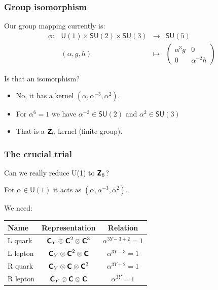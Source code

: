 \documentclass[english, fleqn]{beamer}
\begin{document}
\begin{frame}
    \frametitle{Group isomorphism}

    Our group mapping currently is:
    \[
        \begin{array}{lccc}
            \phi\colon & \mathsf{U}(1) \times \mathsf{SU}(2) \times \mathsf{SU}(3) & \to & \mathsf{SU}(5) \\
            & (\alpha, g, h) & \mapsto &
            \begin{pmatrix}
                \alpha^3 g & 0 \\
                0 & \alpha^{-2} h
            \end{pmatrix}
        \end{array}
    \]

    \pause

    \begin{block}{Is that an isomorphism?}
        \begin{itemize}
            \item No, it has a kernel $(\alpha, \alpha^{-3}, \alpha^2)$.
            \item For $\alpha^6 = 1$ we have $\alpha^{-3} \in \mathsf{SU}(2)$ and $\alpha^{2} \in \mathsf{SU}(3)$
            \item That is a $\text{\bfseries\sffamily{Z}}_6$ kernel (finite group).
        \end{itemize}
    \end{block}
\end{frame}

\begin{frame}
    \frametitle{The crucial trial}

    Can we really reduce U(1) to $\text{\bfseries\sffamily{Z}}_6$?

    For $\alpha \in \mathsf U(1)$ it acts as $(\alpha, \alpha^{-3}, \alpha^2)$.

    We need:

    \begin{tabular}{lcc}
        \toprule
        Name & Representation & Relation \\
        \midrule
        L quark &
        $\text{\bfseries\sffamily{C}}_{Y} \otimes \text{\bfseries\sffamily{C}}^2 \otimes \text{\bfseries\sffamily{C}}^3$ &
        $\alpha^{3Y -3 +2} = 1$ \\
        L lepton &
        $\text{\bfseries\sffamily{C}}_{Y} \otimes \text{\bfseries\sffamily{C}}^2 \otimes \text{\bfseries\sffamily{C}}$ &
        $\alpha^{3Y -3} = 1$ \\
        R quark &
        $\text{\bfseries\sffamily{C}}_{Y} \otimes \text{\bfseries\sffamily{C}} \otimes \text{\bfseries\sffamily{C}}^3$ &
        $\alpha^{3Y +2} = 1$ \\
        R lepton &
        $\text{\bfseries\sffamily{C}}_{Y} \otimes \text{\bfseries\sffamily{C}} \otimes \text{\bfseries\sffamily{C}}$ &
        $\alpha^{3Y} = 1$ \\
        \bottomrule
    \end{tabular}
\end{frame}
\end{document}
